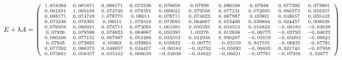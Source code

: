 \documentclass[12pt]{article}
\begin{document}
\begin{equation*}
	\scriptsize
	E + \uplambda A =
	 \left(
	\begin{array}{cccccccccc}
		1,054394 & 0,061851 & 0,068171 & 0,073236 & 0,076956 & 0,07926 & 0,080106 & 0,07948 & 0,077392 & 0,073881 \\
		0,061851 & 1,069188 & 0,074749 & 0,078391 & 0,080021 & 0,079598 & 0,077131 & 0,072685 & 0,066373 & 0,058357 \\
		0,068171 & 0,074749 & 1,078775 & 0,08011 & 0,078711 & 0,074623 & 0,067987 & 0,05903 & 0,048057 & 0,035442 \\
		0,073236 & 0,078391 & 0,08011 & 1,078319 & 0,073095 & 0,064667 & 0,053406 & 0,039804 & 0,024457 & 0,008039 \\
		0,076956 & 0,080021 & 0,078711 & 0,073095 & 1,063481 & 0,050395 & 0,034553 & 0,016822 & -0,00183 & -0,02038 \\
		0,07926 & 0,079598 & 0,074623 & 0,064667 & 0,050395 & 1,03276 & 0,012938 & -0,00775 & -0,02792 & -0,04622 \\
		0,080106 & 0,077131 & 0,067987 & 0,053406 & 0,034553 & 0,012938 & 0,990287 & -0,03159 & -0,05093 & -0,06621 \\
		0,07948 & 0,072685 & 0,05903 & 0,039804 & 0,016822 & -0,00775 & -0,03159 & 0,947555 & -0,06835 & -0,07781 \\
		0,077392 & 0,066373 & 0,048057 & 0,024457 & -0,00183 & -0,02792 & -0,05093 & -0,06835 & 0,921743 & -0,07956 \\
		0,073881 & 0,058357 & 0,035442 & 0,008039 & -0,02038 & -0,04622 & -0,06621 & -0,07781 & -0,07956 & 0,92877
	\end{array}
	\right)
\end{equation*}
\end{document}
